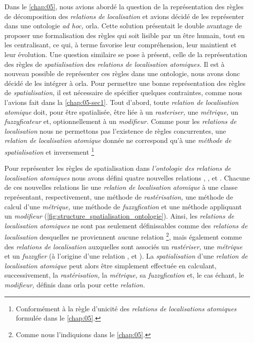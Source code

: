 Dans le \autoref{chap:05}, nous avions abordé la question de la
représentation des règles de décomposition des \emph{relations de
  localisation} et avions décidé de les représenter dans une ontologie
\emph{ad hoc,} \ac{orla}. Cette solution présentait le double avantage
de proposer une formalisation des règles qui soit lisible par un être
humain, tout en les centralisant, ce qui, à terme favorise leur
compréhension, leur maintient et leur évolution. Une question
similaire se pose à présent, celle de la représentation des règles de
\emph{spatialisation} des \emph{relations de localisation atomiques.}
Il est à nouveau possible de représenter ces règles dans une
ontologie, nous avons donc décidé de les intégrer à \ac{orla}. Pour
permettre une bonne représentation des règles de
\emph{spatialisation,} il est nécessaire de spécifier quelques
contraintes, comme nous l'avions fait dans la
\autoref{chap:05-sec1}. Tout d'abord, toute \emph{relation de
  localisation atomique} doit, pour être spatialisée, être liée à un
\emph{rasteriser,} une \emph{métrique,} un \emph{fuzzyficateur} et,
optionnellement à un \emph{modifieur.} Comme pour les \emph{relations
  de localisation} nous ne permettons pas l’existence de règles
concurrentes, une \emph{relation de localisation atomique} donnée
ne correspond qu'à une \emph{méthode de spatialisation} et inversement
\footnote{Conformément à la règle d'unicité des \emph{relations de
  localisations atomiques} formulée dans le \autoref{chap:05}.}

Pour représenter les règles de spatialisation dans \emph{l'ontologie
  des relations de localisation atomiques} nous avons défini quatre
nouvelles relations ,
,  et
. Chacune de ces nouvelles relations lie
une \emph{relation de localisation atomique} à une classe
représentant, respectivement, une méthode de \emph{rastérisation,} une
méthode de calcul d'une \emph{métrique,} une méthode de
\emph{fuzzyfication} et une méthode appliquant un \emph{modifieur}
(\autoref{fig:structure_spatialisation_ontologie}). Ainsi, les
\emph{relations de localisation atomiques} ne sont pas seulement
définissables comme des \emph{relations de localisation} desquelles ne
proviennent aucune relation
 \footnote{Comme nous
  l'indiquions dans le \autoref{chap:05}.}, mais également comme des
\emph{relations de localisation} auxquelles sont associés un
\emph{rastériser,} une \emph{métrique} et un \emph{fuzzyfier} (\ie à
l'origine d'une relation ,
 et ). La
\emph{spatialisation} d'une \emph{relation de localisation atomique}
peut alors être simplement effectuée en calculant, successivement, la
\emph{rastérisation,} la \emph{métrique,} sa \emph{fuzzyfication} et,
le cas échant, le \emph{modifieur,} définis dans \ac{orla} pour cette
\emph{relation.}

